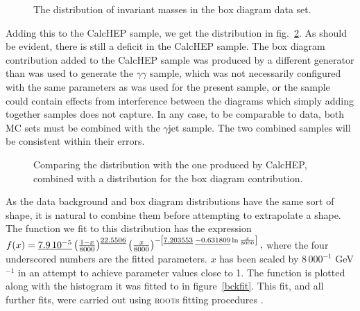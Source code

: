 \begin{figure}[htp]
\begin{minipage}[b]{.69\textwidth}
\begin{infilsf} \tiny

\end{infilsf}
\end{minipage}
\begin{minipage}[b]{.3\textwidth}
\caption{The distribution of invariant masses in the \atlas{} box diagram data set.}\label{boxmgg}
\end{minipage}
\end{figure}

Adding this to the CalcHEP sample, we get the distribution in fig.~\ref{ggcomp}. As should be evident, there is still a deficit in the CalcHEP sample. The box diagram contribution added to the CalcHEP sample was produced by a different generator than was used to generate the \atlas{} $\gamma\gamma$ sample, which was not necessarily configured with the same parameters as was used for the present sample, or the \altas{} sample could contain effects from interference between the diagrams which simply adding together samples does not capture. In any case, to be comparable to data, both MC sets must be combined with the $\gamma$jet sample. The two combined samples will be consistent within their errors.

\begin{figure}[htp]
\begin{minipage}[b]{.69\textwidth}
\begin{infilsf} \tiny

\end{infilsf}
\end{minipage}
\begin{minipage}[b]{.3\textwidth}
\caption{Comparing the \atlas{} distribution with the one produced by CalcHEP, combined with a distribution for the box diagram contribution.}\label{ggcomp}
\end{minipage}
\end{figure}

As the data background and box diagram distributions have the same sort of shape, it is natural to combine them before attempting to extrapolate a shape. The function we fit to this distribution has the expression
\(f(x)=\underline{7.9\,10^{-5}}\left(\frac{1-x}{8000}\right)^{\underline{22.5506}}\left(\frac{x}{8000}\right)^{-\left[\underline{7.203553}\;\underline{-0.631809}\ln\frac{x}{8000}\right]},\)
where the four underscored numbers are the fitted parameters. $x$ has been scaled by $8\,000^{-1}$ GeV$^{-1}$ in an attempt to achieve parameter values close to 1. The function is plotted along with the histogram it was fitted to in figure~\ref{bckfit}. This fit, and all further fits, were carried out using \textsc{root}s fitting procedures \cite{root}.

